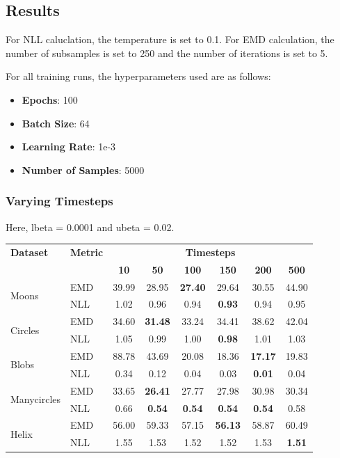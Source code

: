 \documentclass[11pt]{article}
\begin{document}
\subsection{Results}

For NLL caluclation, the temperature is set to 0.1.
For EMD calculation, the number of subsamples is set to 250 and the number of iterations is set to 5.

For all training runs, the hyperparameters used are as follows:
\begin{itemize}
    \item \textbf{Epochs}: 100
    \item \textbf{Batch Size}: 64
    \item \textbf{Learning Rate}: 1e-3
    \item \textbf{Number of Samples}: 5000
\end{itemize}

\subsubsection{Varying Timesteps}
Here, lbeta = 0.0001 and ubeta = 0.02.

\begin{longtable}{|l|l|c|c|c|c|c|c|}
    \hline
    \textbf{Dataset} & \textbf{Metric} & \multicolumn{6}{c|}{\textbf{Timesteps}} \\
    \cline{3-8}
    & & \textbf{10} & \textbf{50} & \textbf{100} & \textbf{150} & \textbf{200} & \textbf{500} \\
    \hline
    \multirow{2}{*}{Moons} & EMD & 39.99 & 28.95 & \textbf{27.40} & 29.64 & 30.55 & 44.90 \\
    \cline{2-8}
    & NLL & 1.02 & 0.96 & 0.94 & \textbf{0.93} & 0.94 & 0.95 \\
    \hline
    \multirow{2}{*}{Circles} & EMD & 34.60 & \textbf{31.48} & 33.24 & 34.41 & 38.62 & 42.04 \\
    \cline{2-8}
    & NLL & 1.05 & 0.99 & 1.00 & \textbf{0.98} & 1.01 & 1.03 \\
    \hline
    \multirow{2}{*}{Blobs} & EMD & 88.78 & 43.69 & 20.08 & 18.36 & \textbf{17.17} & 19.83 \\
    \cline{2-8}
    & NLL & 0.34 & 0.12 & 0.04 & 0.03 & \textbf{0.01} & 0.04 \\
    \hline
    \multirow{2}{*}{Manycircles} & EMD & 33.65 & \textbf{26.41} & 27.77 & 27.98 & 30.98 & 30.34 \\
    \cline{2-8}
    & NLL & 0.66 & \textbf{0.54} & \textbf{0.54} & \textbf{0.54} & \textbf{0.54} & 0.58 \\
    \hline
    \multirow{2}{*}{Helix} & EMD & 56.00 & 59.33 & 57.15 & \textbf{56.13} & 58.87 & 60.49 \\
    \cline{2-8}
    & NLL & 1.55 & 1.53 & 1.52 & 1.52 & 1.53 & \textbf{1.51} \\
    \hline
\end{longtable}
\end{document}
